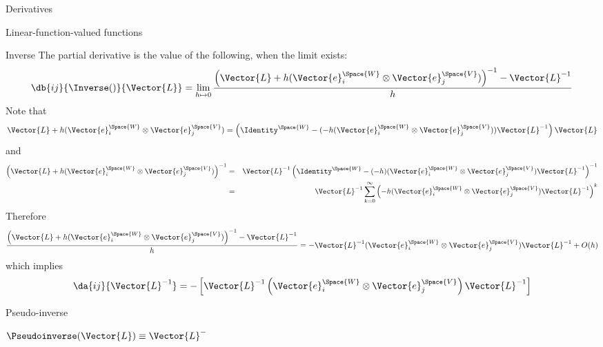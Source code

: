 \begin{plSection}{Derivatives}
\begin{plSection}{Linear-function-valued functions}
\begin{plSection}{Inverse}
The partial derivative is the value of the following, when the limit exists:
\begin{displaymath}
\db{ij}{\Inverse()}{\Vector{L}}
 =
\lim_{ h \mapsto 0}
\frac{ \left( \Vector{L} + h (\Vector{e}_i^{\Space{W}} \otimes \Vector{e}_j^{\Space{V}}) \right)^{-1} - \Vector{L}^{-1} }{h}
\end{displaymath}
Note that
\begin{displaymath}
\Vector{L} + h (\Vector{e}_i^{\Space{W}} \otimes \Vector{e}_j^{\Space{V}})
 =
\left( \Identity^{\Space{W}} - ( -h ( \Vector{e}_i^{\Space{W}} \otimes \Vector{e}_j^{\Space{V}} )) \Vector{L}^{-1} \right) \Vector{L}
\end{displaymath}
and
\begin{eqnarray*}
\left( \Vector{L} + h (\Vector{e}_i^{\Space{W}} \otimes \Vector{e}_j^{\Space{V}}) \right)^{-1}
& = &
\Vector{L}^{-1} \left( \Identity^{\Space{W}} - ( -h )( \Vector{e}_i^{\Space{W}} \otimes \Vector{e}_j^{\Space{V}} ) \Vector{L}^{-1} \right)^{-1}
\\
& = &
\Vector{L}^{-1} \sum_{k=0}^{\infty} \left( -h ( \Vector{e}_i^{\Space{W}} \otimes \Vector{e}_j^{\Space{V}} ) \Vector{L}^{-1} \right)^{k}
\nonumber
\end{eqnarray*}
Therefore
\begin{displaymath}
\frac{ \left( \Vector{L} + h (\Vector{e}_i^{\Space{W}} \otimes \Vector{e}_j^{\Space{V}}) \right)^{-1} - \Vector{L}^{-1} }{h}
 =
- \Vector{L}^{-1} ( \Vector{e}_i^{\Space{W}} \otimes \Vector{e}_j^{\Space{V}} )  \Vector{L}^{-1} + O(h)
\end{displaymath}
which implies
\begin{equation}
\da{ij}{\Vector{L}^{-1}}
 =
- \left[
\Vector{L}^{-1}
\left( \Vector{e}_i^{\Space{W}} \otimes \Vector{e}_j^{\Space{V}} \right)
\Vector{L}^{-1}
\right]
\end{equation}


\end{plSection}%
\begin{plSection}{Pseudo-inverse}
\label{sec:Derivative-of-pseudo-inverse}

$\Pseudoinverse(\Vector{L}) \equiv \Vector{L}^{-}$


\end{plSection}
\end{plSection}
\end{plSection}
